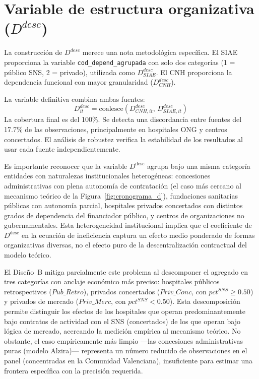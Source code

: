 \documentclass[12pt, a4paper, twoside, openright]{book}
\theoremstyle{plain}
\theoremstyle{definition}
\theoremstyle{remark}
\begin{document}
\section{Variable de estructura organizativa (\texorpdfstring{$D^{desc}$}{D\^{}desc})}

La construcción de $D^{desc}$ merece una nota metodológica específica. El SIAE proporciona la variable \texttt{cod\_depend\_agrupada} con solo dos categorías (1 = público SNS, 2 = privado), utilizada como $D^{desc}_{SIAE}$. El CNH proporciona la dependencia funcional con mayor granularidad ($D^{desc}_{CNH}$).

La variable definitiva combina ambas fuentes:
\begin{equation}
  D^{desc}_{it} = \text{coalesce}(D^{desc}_{CNH,it},\, D^{desc}_{SIAE,it})
\end{equation}
La cobertura final es del 100\%. Se detecta una discordancia entre fuentes del 17.7\% de las observaciones, principalmente en hospitales ONG y centros concertados. El análisis de robustez verifica la estabilidad de los resultados al usar cada fuente independientemente.

Es importante reconocer que la variable $D^{\text{desc}}$ agrupa bajo una misma categoría entidades con naturalezas institucionales heterogéneas: concesiones administrativas con plena autonomía de contratación (el caso más cercano al mecanismo teórico de la Figura~\ref{fig:cronograma_d}), fundaciones sanitarias públicas con autonomía parcial, hospitales privados concertados con distintos grados de dependencia del financiador público, y centros de organizaciones no gubernamentales. Esta heterogeneidad institucional implica que el coeficiente de $D^{\text{desc}}$ en la ecuación de ineficiencia captura un efecto medio ponderado de formas organizativas diversas, no el efecto puro de la descentralización contractual del modelo teórico.

El Diseño~B mitiga parcialmente este problema al descomponer el agregado en tres categorías con anclaje económico más preciso: hospitales públicos retrospectivos ($Pub\_Retro$), privados concertados ($Priv\_Conc$, con $pct^{SNS} \geq 0.50$) y privados de mercado ($Priv\_Merc$, con $pct^{SNS} < 0.50$). Esta descomposición permite distinguir los efectos de los hospitales que operan predominantemente bajo contratos de actividad con el SNS (concertados) de los que operan bajo lógica de mercado, acercando la medición empírica al mecanismo teórico. No obstante, el caso empíricamente más limpio ---las concesiones administrativas puras (modelo Alzira)--- representa un número reducido de observaciones en el panel (concentradas en la Comunidad Valenciana), insuficiente para estimar una frontera específica con la precisión requerida.
\end{document}
